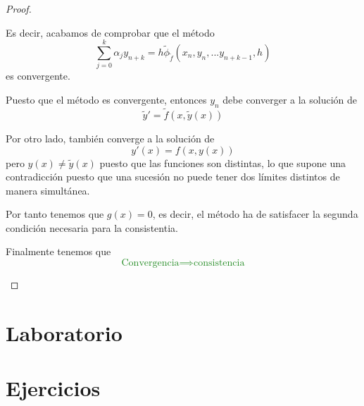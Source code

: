 \documentclass{apuntes}
\begin{document}
\begin{proof}
\begin{itemize}
\begin{enumerate}
\begin{enumerate}
Es decir, acabamos de comprobar que el método 
\[\sum_{j=0}^kα_jy_{n+k} = h \tilde{\phi}_{\tilde{f}}(x_n,y_n,...y_{n+k-1},h)\]
es convergente.

Puesto que el método es convergente, entonces $y_n$ debe converger a la solución de 
\[\tilde{y}'=\tilde{f}(x,\tilde{y}(x))\]

Por otro lado, también converge a la solución de
\[y'(x)=f(x,y(x))\]
pero $y(x)\neq \tilde{y}(x)$ puesto que las funciones son distintas, lo que supone una contradicción puesto que una sucesión no puede tener dos límites distintos de manera simultánea.

Por tanto tenemos que $g(x)=0$, es decir, el método ha de satisfacer la segunda condición necesaria para la consistentia.
\end{enumerate}
Finalmente tenemos que
\textcolor{ForestGreen}{\[\text{Convergencia} \implies \text{consistencia}\]}
\end{enumerate}
\end{itemize}

\end{proof}

\chapter{Laboratorio}

\appendix

\chapter{Ejercicios}

\printindex
\end{document}
